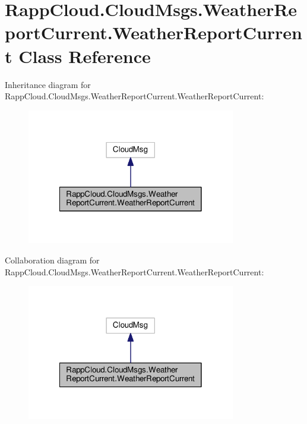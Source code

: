 \hypertarget{classRappCloud_1_1CloudMsgs_1_1WeatherReportCurrent_1_1WeatherReportCurrent}{\section{Rapp\-Cloud.\-Cloud\-Msgs.\-Weather\-Report\-Current.\-Weather\-Report\-Current Class Reference}
\label{classRappCloud_1_1CloudMsgs_1_1WeatherReportCurrent_1_1WeatherReportCurrent}
}


Inheritance diagram for Rapp\-Cloud.\-Cloud\-Msgs.\-Weather\-Report\-Current.\-Weather\-Report\-Current\-:
\nopagebreak
\begin{figure}[H]
\begin{center}
\leavevmode
\includegraphics[width=258pt]{classRappCloud_1_1CloudMsgs_1_1WeatherReportCurrent_1_1WeatherReportCurrent__inherit__graph}
\end{center}
\end{figure}


Collaboration diagram for Rapp\-Cloud.\-Cloud\-Msgs.\-Weather\-Report\-Current.\-Weather\-Report\-Current\-:
\nopagebreak
\begin{figure}[H]
\begin{center}
\leavevmode
\includegraphics[width=258pt]{classRappCloud_1_1CloudMsgs_1_1WeatherReportCurrent_1_1WeatherReportCurrent__coll__graph}
\end{center}
\end{figure}
